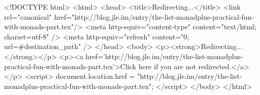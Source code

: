 <!DOCTYPE html>
<html>
<head>
<title>Redirecting...</title>
<link rel="canonical" href="http://blog.jle.im/entry/the-list-monadplus-practical-fun-with-monads-part.tex"/>
<meta http-equiv="content-type" content="text/html; charset=utf-8" />
<meta http-equiv="refresh" content="0; url=#{destination_path}" />
</head>
<body>
  <p><strong>Redirecting...</strong></p>
  <p><a href='http://blog.jle.im/entry/the-list-monadplus-practical-fun-with-monads-part.tex'>Click here if you are not redirected.</a></p>
  <script>
    document.location.href = "http://blog.jle.im/entry/the-list-monadplus-practical-fun-with-monads-part.tex";
  </script>
</body>
</html>
